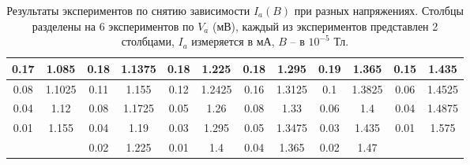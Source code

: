\documentclass[a4paper, 14pt]{extarticle}%
\newcommand\ECaption[1]{%
     \captionsetup{font=footnotesize}%
     \caption{#1}}
\begin{document}
\begin{table}[h!]
\begin{center}
\begin{tabular}{|c|c|cc|cc|cc|cc|cc|}
\rowcolor[HTML]{9698ED} 
0.17  & 1.085  & \multicolumn{1}{c|}{\cellcolor[HTML]{9698ED}0.18} & 1.1375                        & \multicolumn{1}{c|}{\cellcolor[HTML]{9698ED}0.18} & 1.225                       & \multicolumn{1}{c|}{\cellcolor[HTML]{9698ED}0.18} & 1.295                         & \multicolumn{1}{c|}{\cellcolor[HTML]{9698ED}0.19} & 1.365                        & \multicolumn{1}{c|}{\cellcolor[HTML]{9698ED}0.15} & 1.435  \\ \hline
0.08  & 1.1025 & \multicolumn{1}{c|}{0.11}                         & 1.155                         & \multicolumn{1}{c|}{0.12}                         & 1.2425                      & \multicolumn{1}{c|}{0.16}                         & 1.3125                        & \multicolumn{1}{c|}{0.1}                          & 1.3825                       & \multicolumn{1}{c|}{0.06}                         & 1.4525 \\ \hline
\rowcolor[HTML]{9698ED} 
0.04  & 1.12   & \multicolumn{1}{c|}{\cellcolor[HTML]{9698ED}0.08} & 1.1725                        & \multicolumn{1}{c|}{\cellcolor[HTML]{9698ED}0.05} & 1.26                        & \multicolumn{1}{c|}{\cellcolor[HTML]{9698ED}0.08} & 1.33                          & \multicolumn{1}{c|}{\cellcolor[HTML]{9698ED}0.06} & 1.4                          & \multicolumn{1}{c|}{\cellcolor[HTML]{9698ED}0.04} & 1.4875 \\ \hline
0.01  & 1.155  & \multicolumn{1}{c|}{0.04}                         & 1.19                          & \multicolumn{1}{c|}{0.03}                         & 1.295                       & \multicolumn{1}{c|}{0.05}                         & 1.3475                        & \multicolumn{1}{c|}{0.03}                         & 1.435                        & \multicolumn{1}{c|}{0.01}                         & 1.575  \\ \hline
      &        & \multicolumn{1}{c|}{\cellcolor[HTML]{9698ED}0.02} & \cellcolor[HTML]{9698ED}1.225 & \multicolumn{1}{c|}{\cellcolor[HTML]{9698ED}0.01} & \cellcolor[HTML]{9698ED}1.4 & \multicolumn{1}{c|}{\cellcolor[HTML]{9698ED}0.04} & \cellcolor[HTML]{9698ED}1.365 & \multicolumn{1}{c|}{\cellcolor[HTML]{9698ED}0.02} & \cellcolor[HTML]{9698ED}1.47 & \multicolumn{1}{c|}{}                             &        \\ \hline
\end{tabular}
\ECaption{Результаты экспериментов по снятию зависимости $I_a(B)$ при разных напряжениях. Столбцы разделены на 6 экспериментов по $V_a$ (мВ), каждый из экспериментов представлен 2 столбцами, $I_a$ измеряется в мА, $B$ -- в $10^{-5}$ Тл. }
\end{center}
\end{table}
\end{document}
